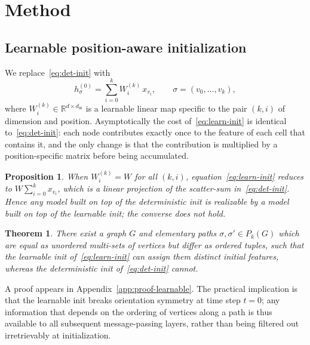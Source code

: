 \documentclass{article}
\newtheorem{proposition}[definition]{Proposition}
\newtheorem{theorem}[definition]{Theorem}
\begin{document}
\section{Method}
\label{section:method}

\subsection{Learnable position-aware initialization}
\label{subsec:learnable-init}
We replace~\eqref{eq:det-init} with
\begin{equation}
  h_\sigma^{(0)} = \sum_{i=0}^{k} W_i^{(k)} \, x_{v_i}, \qquad \sigma = (v_0, \ldots, v_k), \label{eq:learn-init}
\end{equation}
where $W_i^{(k)} \in \mathbb{R}^{d \times d_\text{in}}$ is a learnable linear map specific to the pair $(k, i)$ of dimension and position. Asymptotically the cost of~\eqref{eq:learn-init} is identical to~\eqref{eq:det-init}: each node contributes exactly once to the feature of each cell that contains it, and the only change is that the contribution is multiplied by a position-specific matrix before being accumulated.

\begin{proposition}
  \label{prop:learnable-subsumes-det}
  When $W_i^{(k)} = W$ for all $(k, i)$, equation~\eqref{eq:learn-init} reduces to $W \sum_{i=0}^{k} x_{v_i}$, which is a linear projection of the scatter-sum in~\eqref{eq:det-init}. Hence any model built on top of the deterministic init is realizable by a model built on top of the learnable init; the converse does not hold.
\end{proposition}

\begin{theorem}
  \label{thm:learnable-breaks-symmetry}
  There exist a graph $G$ and elementary paths $\sigma, \sigma' \in P_k(G)$ which are equal as unordered multi-sets of vertices but differ as ordered tuples, such that the learnable init of~\eqref{eq:learn-init} can assign them distinct initial features, whereas the deterministic init of~\eqref{eq:det-init} cannot.
\end{theorem}
A proof appears in Appendix~\ref{app:proof-learnable}. The practical implication is that the learnable init breaks orientation symmetry at time step $t = 0$; any information that depends on the ordering of vertices along a path is thus available to all subsequent message-passing layers, rather than being filtered out irretrievably at initialization.
\end{document}
